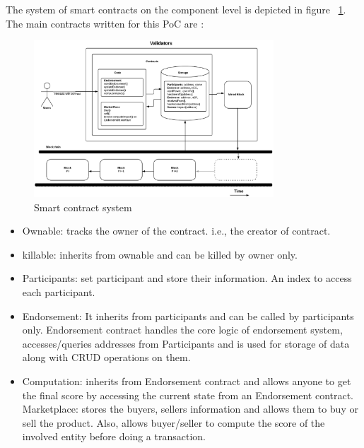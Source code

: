 The system of smart contracts on the component level is depicted in figure
~\ref{fig:smartcontracts}. The main contracts written for this PoC are : 

\begin{figure}
	\centering
	\includegraphics[width=0.8\textwidth]{Images/SmartContractsEDSMarketPlace.eps}
	\caption{Smart contract system}
	\label{fig:smartcontracts}
\end{figure}

\begin{itemize}
	\item Ownable: tracks the owner of the contract. i.e., the creator of
		contract. 
	\item killable: inherits from ownable and can be killed by owner only. 
	\item Participants: set participant and store their information. An index
		to access each participant. 
	\item Endorsement: It inherits from participants and can be called by
		participants only. Endorsement contract handles the core logic of
		endorsement system, accesses/queries addresses from Participants and is
		used for storage of data along with CRUD operations on them.  
	\item Computation: inherits from Endorsement contract and allows anyone to
		get the final score by accessing the current state from an Endorsement
		contract.
	\iitem Marketplace: stores the buyers, sellers information and allows them
		to buy or sell the product. Also, allows buyer/seller to compute the
		score of the involved entity before doing a transaction.  
\end{itemize}

